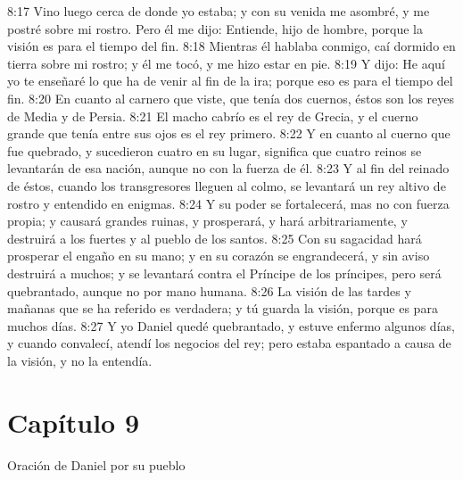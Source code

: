 8:17 Vino luego cerca de donde yo estaba; y con su venida me asombré, y me postré sobre mi rostro. Pero él me dijo: Entiende, hijo de hombre, porque la visión es para el tiempo del fin. 
8:18 Mientras él hablaba conmigo, caí dormido en tierra sobre mi rostro; y él me tocó, y me hizo estar en pie. 
8:19 Y dijo: He aquí yo te enseñaré lo que ha de venir al fin de la ira; porque eso es para el tiempo del fin. 
8:20 En cuanto al carnero que viste, que tenía dos cuernos, éstos son los reyes de Media y de Persia. 
8:21 El macho cabrío es el rey de Grecia, y el cuerno grande que tenía entre sus ojos es el rey primero. 
8:22 Y en cuanto al cuerno que fue quebrado, y sucedieron cuatro en su lugar, significa que cuatro reinos se levantarán de esa nación, aunque no con la fuerza de él. 
8:23 Y al fin del reinado de éstos, cuando los transgresores lleguen al colmo, se levantará un rey altivo de rostro y entendido en enigmas. 
8:24 Y su poder se fortalecerá, mas no con fuerza propia; y causará grandes ruinas, y prosperará, y hará arbitrariamente, y destruirá a los fuertes y al pueblo de los santos. 
8:25 Con su sagacidad hará prosperar el engaño en su mano; y en su corazón se engrandecerá, y sin aviso destruirá a muchos; y se levantará contra el Príncipe de los príncipes, pero será quebrantado, aunque no por mano humana. 
8:26 La visión de las tardes y mañanas que se ha referido es verdadera; y tú guarda la visión, porque es para muchos días. 
8:27 Y yo Daniel quedé quebrantado, y estuve enfermo algunos días, y cuando convalecí, atendí los negocios del rey; pero estaba espantado a causa de la visión, y no la entendía. 
\section*{Capítulo 9 }
Oración de Daniel por su pueblo 
 
